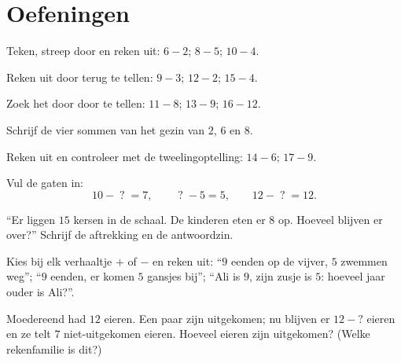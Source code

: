 \section{Oefeningen}

\begin{exercise}[$\star$]\label{exo:g1:subtraction:1}
Teken, streep door en reken uit: $6 - 2$; \quad $8 - 5$; \quad
$10 - 4$.
\end{exercise}

\begin{exercise}[$\star$]\label{exo:g1:subtraction:2}
Reken uit door terug te tellen: $9 - 3$; \quad $12 - 2$; \quad
$15 - 4$.
\end{exercise}

\begin{exercise}[$\star$]\label{exo:g1:subtraction:3}
Zoek het  door door te tellen: $11 - 8$; \quad $13 - 9$; \quad
$16 - 12$.
\end{exercise}

\begin{exercise}[$\star$]\label{exo:g1:subtraction:4}
Schrijf de vier sommen van het gezin van $2$, $6$ en $8$.
\end{exercise}

\begin{exercise}[$\star$]\label{exo:g1:subtraction:5}
Reken uit en controleer met de tweelingoptelling: $14 - 6$; \quad
$17 - 9$.
\end{exercise}

\begin{exercise}[$\star$]\label{exo:g1:subtraction:6}
Vul de gaten in:
\[
10 - \;?\; = 7, \qquad
\;?\; - 5 = 5, \qquad
12 - \;?\; = 12 .
\]
\end{exercise}

\begin{exercise}[$\star$]\label{exo:g1:subtraction:7}
``Er liggen $15$ kersen in de schaal. De kinderen eten er $8$ op.
Hoeveel blijven er over?'' Schrijf de aftrekking en de antwoordzin.
\end{exercise}

\begin{exercise}[$\star$]\label{exo:g1:subtraction:8}
Kies bij elk verhaaltje $+$ of $-$ en reken uit: ``$9$ eenden op de
vijver, $5$ zwemmen weg''; ``$9$ eenden, er komen $5$ gansjes bij'';
``Ali is $9$, zijn zusje is $5$: hoeveel jaar ouder is Ali?''.
\end{exercise}

\begin{exercise}[$\star\star$]\label{exo:g1:subtraction:9}
Moedereend had $12$ eieren. Een paar zijn uitgekomen; nu blijven er
$12 - ?$ eieren en ze telt $7$ niet-uitgekomen eieren. Hoeveel eieren
zijn uitgekomen? (Welke rekenfamilie is dit?)
\end{exercise}
